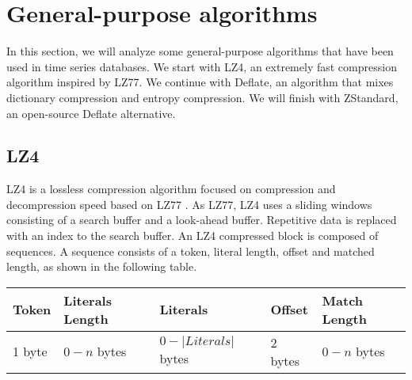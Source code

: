 \section{General-purpose algorithms}
In this section, we will analyze some general-purpose algorithms that have been used in
time series databases. We start with LZ4, an extremely fast compression algorithm inspired
by LZ77. We continue with Deflate, an algorithm that mixes dictionary compression and entropy
compression. We will finish with ZStandard, an open-source Deflate alternative.

\subsection{LZ4}
LZ4 is a lossless compression algorithm focused on compression and decompression speed
based on LZ77 \cite{ziv1977universal}\cite{lz42019lz4lz4}. As LZ77, LZ4 uses a sliding windows
consisting of a search buffer and a look-ahead buffer. Repetitive data is replaced with
an index to the search buffer. An LZ4 compressed block is composed of sequences.
A sequence consists of a token, literal length, offset and matched length, as
shown in the following table.
\begin{table}[!htbp]
\centering
\begin{tabular}{l|l|l|l|l}
\textbf{Token} & \textbf{Literals Length} & \textbf{Literals} & \textbf{Offset} & \textbf{Match Length} \\ 
\hline
1 byte & $0-n$ bytes & $0-|Literals|$ bytes & 2 bytes & $0-n$ bytes \\
\end{tabular}
\end{table}

